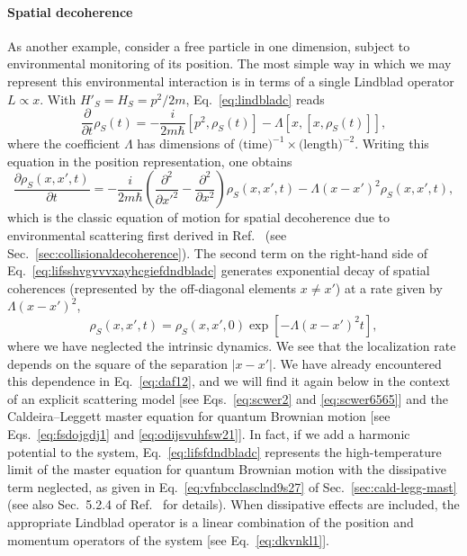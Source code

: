 \documentclass[3p,sort&compress]{elsarticle}
\providecommand{\abs}[1]{\left\lvert#1\right\rvert}
\newcommand{\I}{\ensuremath{i}}
\newcommand{\op}[1]{#1}
\begin{document}
\paragraph{Spatial decoherence} As another example, consider a free particle in one dimension, subject to environmental monitoring of its position. The most simple way in which we may represent this environmental interaction is in terms of a single Lindblad operator $L \propto \op{x}$. With $\op{H}'_S = \op{H}_S = p^2/2m$, Eq.~\eqref{eq:lindbladc} reads
%
\begin{equation}\label{eq:lifsfdndbladc}
\frac{\partial}{\partial t} \op{\rho}_S(t) =  -\frac{\I}{2m\hbar}\left[p^2, \op{\rho}_S(t) \right] - \Lambda \left[ x, \left[ x, \op{\rho}_S(t) \right]\right],
\end{equation}
%
where the coefficient $\Lambda$ has dimensions of $\text{(time)}^{-1} \times \text{(length)}^{-2}$. Writing this equation in the position representation, one obtains
%
\begin{equation}\label{eq:lifsshvgvvvxayhcgiefdndbladc}
  \frac{\partial \op{\rho}_S(x,x',t)}{\partial t} = - \frac{\I}{2m\hbar} \left(\frac{ \partial^2}{\partial x'^2}- \frac{ \partial^2}{\partial x^2} \right) \op{\rho}_S(x,x',t) -  \Lambda
  \left(x-x'\right)^2   \op{\rho}_S(x,x',t),
\end{equation}
%
which is the classic equation of motion for spatial decoherence due to environmental scattering first derived in Ref.~\cite{Joos:1985:iu} (see Sec.~\ref{sec:collisionaldecoherence}). The second term on the right-hand side of Eq.~\eqref{eq:lifsshvgvvvxayhcgiefdndbladc} generates exponential decay of spatial coherences (represented by the off-diagonal elements $x\not= x'$) at a rate given by $ \Lambda \left(x-x'\right)^2$, 
%
\begin{equation}
\rho_S(x,x',t) =\rho_S(x,x',0) \exp\left[-\Lambda (x-x')^2 t\right],
\end{equation}
%
where we have neglected the intrinsic dynamics. We see that the localization rate depends on the square of the separation $\abs{x-x'}$. We have already encountered this dependence in Eq.~\eqref{eq:daf12}, and we will find it again below in the context of an explicit scattering model [see Eqs.~\eqref{eq:scwer2}
 and \eqref{eq:scwer6565}] and the Caldeira--Leggett master equation for quantum Brownian motion [see Eqs.~\eqref{eq:fsdojgdj1} and \eqref{eq:odijsvuhfsw21}]. In fact, if we add a harmonic potential to the system, Eq.~\eqref{eq:lifsfdndbladc} represents the high-temperature limit of the master equation for quantum Brownian motion with the dissipative term neglected, as given in Eq.~\eqref {eq:vfnbcclasclnd9s27} of Sec.~\ref{sec:cald-legg-mast} (see also Sec.~5.2.4 of Ref.~\cite{Schlosshauer:2007:un} for details). When dissipative effects are included, the appropriate Lindblad operator is a linear combination of the position and momentum operators of the system [see Eq.~\eqref{eq:dkvnkl1}].
\end{document}
